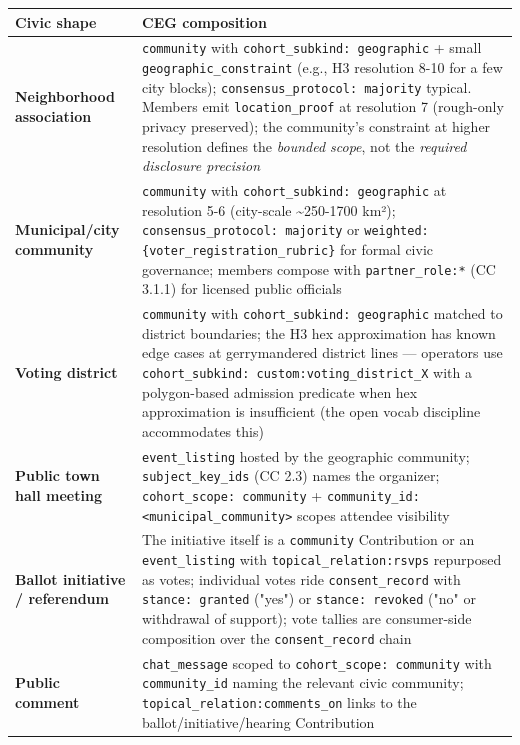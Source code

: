 \documentclass[11pt]{article}
\begin{document}
{\footnotesize
\begin{longtable}{|p{8.0cm}|p{8.0cm}|}\hline
\textbf{Civic shape} & \textbf{CEG composition} \\ \hline\endhead
\textbf{Neighborhood association} & \texttt{community} with \texttt{cohort\_subkind: geographic} + small \texttt{geographic\_constraint} (e.g., H3 resolution 8-10 for a few city blocks); \texttt{consensus\_protocol: majority} typical. Members emit \texttt{location\_proof} at resolution 7 (rough-only privacy preserved); the community's constraint at higher resolution defines the \textit{bounded scope}, not the \textit{required disclosure precision} \\ \hline
\textbf{Municipal/city community} & \texttt{community} with \texttt{cohort\_subkind: geographic} at resolution 5-6 (city-scale \textasciitilde{}250-1700 km²); \texttt{consensus\_protocol: majority} or \texttt{weighted:\{voter\_registration\_rubric\}} for formal civic governance; members compose with \texttt{partner\_role:*} (CC 3.1.1) for licensed public officials \\ \hline
\textbf{Voting district} & \texttt{community} with \texttt{cohort\_subkind: geographic} matched to district boundaries; the H3 hex approximation has known edge cases at gerrymandered district lines — operators use \texttt{cohort\_subkind: custom:voting\_district\_X} with a polygon-based admission predicate when hex approximation is insufficient (the open vocab discipline accommodates this) \\ \hline
\textbf{Public town hall meeting} & \texttt{event\_listing} hosted by the geographic community; \texttt{subject\_key\_ids} (CC 2.3) names the organizer; \texttt{cohort\_scope: community} + \texttt{community\_id: <municipal\_community>} scopes attendee visibility \\ \hline
\textbf{Ballot initiative / referendum} & The initiative itself is a \texttt{community} Contribution or an \texttt{event\_listing} with \texttt{topical\_relation:rsvps} repurposed as votes; individual votes ride \texttt{consent\_record} with \texttt{stance: granted} ("yes") or \texttt{stance: revoked} ("no" or withdrawal of support); vote tallies are consumer-side composition over the \texttt{consent\_record} chain \\ \hline
\textbf{Public comment} & \texttt{chat\_message} scoped to \texttt{cohort\_scope: community} with \texttt{community\_id} naming the relevant civic community; \texttt{topical\_relation:comments\_on} links to the ballot/initiative/hearing Contribution \\ \hline

\end{longtable}}
\end{document}

